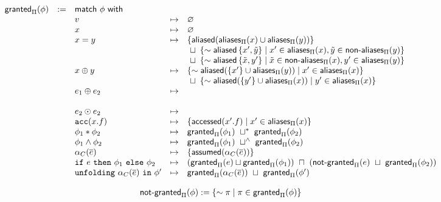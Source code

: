 \begin{align*}
\begin{array}{rclrl}
\tsf{granted}_\Pi(\phi) & := & \tsf{match} \ \phi \ \tsf{with} && \\
%
%
&& v &\mt&
  \empty
\\
&& x &\mt&
  \empty
\\
&& x = y &\mt&
  \set{ \aliased(\aliasesPi(x) \cup \aliasesPi(y)) }
  \\ &&&& \ \merge \
  \set{ \pnot \aliased\set{ x\p, \tilde y }
    \mid x\p \in \aliasesPi(x), \tilde y \in \nonaliasesPi(y) }
  \\ &&&& \ \merge \
  \set{ \pnot \aliased\set{ \tilde x, y\p }
    \mid \tilde x \in \nonaliasesPi(x), y\p \in \aliasesPi(y) }
\\
&& x \oplus y &\mt&
  \set{ \pnot \aliased(\set{ x\p } \cup \aliasesPi(y)) \mid x\p \in \aliasesPi(x) }
  \\ &&&& \ \merge \
  \set{ \pnot \aliased(\set{ y\p } \cup \aliasesPi(x)) \mid y\p \in \aliasesPi(x) }
\\
&& e_1 \oplus e_2 &\mt&
  \\
\\
&& e_2 \odot e_2 &\mt&
\\
&& \cacc(x.f) &\mt&
  \set{ \accessed(x\p.f) \mid x\p \in \aliasesPi(x) }
\\
&& \phi_1 \ast \phi_2 &\mt&
  \tsf{granted}_\Pi(\phi_1) \ \merge^\ast \ \tsf{granted}_\Pi(\phi_2)
\\
&& \phi_1 \land \phi_2 &\mt&
  \tsf{granted}_\Pi(\phi_1) \ \merge^\land \ \tsf{granted}_\Pi(\phi_2)
\\
&& \alpha_C(\vec{e}) &\mt&
  \set{ \assumed(\alpha_C(\vec{e})) }
\\
&& \cif \ e \ \cthen \ \phi_1 \ \celse \ \phi_2 &\mt&
  (\tsf{granted}_\Pi(e) \merge \tsf{granted}_\Pi(\phi_1)) \ \overlap \
  (\notgrantedPi(e) \ \merge \ \tsf{granted}_\Pi(\phi_2))
\\
&& \cunfolding \ \alpha_C(\vec{e}) \ \cin \ \phi\p &\mt&
  \grantedPi(\alpha_C(\vec{e})) \ \merge \
  \grantedPi(\phi\p)
\end{array}
\end{align*}

\begin{align*}
\textsf{not-granted}_\Pi(\phi) := \left\{  \sim \pi \mid \pi \in \textsf{granted}_\Pi(\phi)  \right\}
\end{align*}

